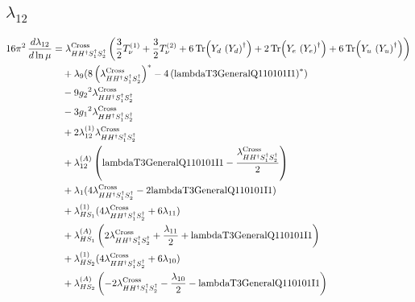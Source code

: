 \documentclass[10pt,a4paper]{article}
\begin{document}
\subsection*{$\lambda_{12}$}
\begin{align*}
16\pi^2\,\frac{d \lambda_{12}}{d\ln\mu} &={\lambda_{H H^\dagger S_1^\dagger S_2^\dagger}^{\rm Cross}} \left(\frac{3}{2} T_{\nu}^{(1)}+\frac{3}{2} T_{\nu}^{(2)}+6 \operatorname{Tr}\!\left({Y_d}\,\left({Y_d}\right)^{\dagger}\right)+2 \operatorname{Tr}\!\left({Y_e}\,\left({Y_e}\right)^{\dagger}\right)+6 \operatorname{Tr}\!\left({Y_u}\,\left({Y_u}\right)^{\dagger}\right)\right) \\
&\quad +{\lambda_{9}} (8 \left({\lambda_{H H^\dagger S_1^\dagger S_2^\dagger}^{\rm Cross}}\right)^{*}-4 \left(\text{lambdaT3GeneralQ110101I1}\right)^{*}) \\
&\quad -9 {g_2}^2 {\lambda_{H H^\dagger S_1^\dagger S_2^\dagger}^{\rm Cross}} \\
&\quad -3 {g_1}^2 {\lambda_{H H^\dagger S_1^\dagger S_2^\dagger}^{\rm Cross}} \\
&\quad +2 {\lambda_{12}^{(1)}} {\lambda_{H H^\dagger S_1^\dagger S_2^\dagger}^{\rm Cross}} \\
&\quad +{\lambda_{12}^{(A)}} \left(\text{lambdaT3GeneralQ110101I1}-\frac{{\lambda_{H H^\dagger S_1^\dagger S_2^\dagger}^{\rm Cross}}}{2}\right) \\
&\quad +{\lambda_1} (4 {\lambda_{H H^\dagger S_1^\dagger S_2^\dagger}^{\rm Cross}}-2 \text{lambdaT3GeneralQ110101I1}) \\
&\quad +{\lambda_{HS_1}^{(1)}} (4 {\lambda_{H H^\dagger S_1^\dagger S_2^\dagger}^{\rm Cross}}+6 {\lambda_{11}}) \\
&\quad +{\lambda_{HS_1}^{(A)}} \left(2 {\lambda_{H H^\dagger S_1^\dagger S_2^\dagger}^{\rm Cross}}+\frac{{\lambda_{11}}}{2}+\text{lambdaT3GeneralQ110101I1}\right) \\
&\quad +{\lambda_{HS_2}^{(1)}} (4 {\lambda_{H H^\dagger S_1^\dagger S_2^\dagger}^{\rm Cross}}+6 {\lambda_{10}}) \\
&\quad +{\lambda_{HS_2}^{(A)}} \left(-2 {\lambda_{H H^\dagger S_1^\dagger S_2^\dagger}^{\rm Cross}}-\frac{{\lambda_{10}}}{2}-\text{lambdaT3GeneralQ110101I1}\right) \\
\end{align*}
\end{document}
